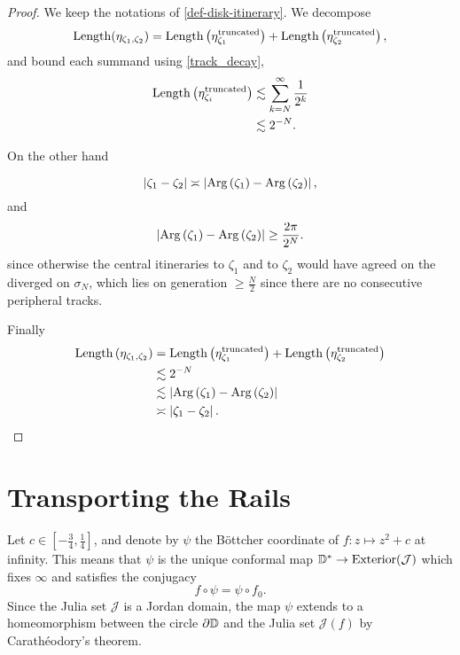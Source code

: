 \begin{proof}
We keep the notations of \cref{def-disk-itinerary}.
We decompose
\begin{equation}
\operatorname{Length}(\eta_{\zeta_{1},\zeta_{2}})=\operatorname{Length}\left(\eta_{\zeta_{1}}^{\text{truncated}}\right)+\operatorname{Length}\left(\eta_{\zeta_{2}}^{\text{truncated}}\right),
\end{equation}
and bound each summand using \cref{track_decay},
\begin{align}
\operatorname{Length}\left(\eta_{\zeta_{i}}^{\text{truncated}}\right)
&\lesssim\sum_{k=N}^{\infty}\frac{1}{2^{k}} \\ 
&\lesssim2^{-N}.
\end{align}

On the other hand 

\begin{equation}
\left|\zeta_{1}-\zeta_{2}\right|
\asymp
	\left|\operatorname{Arg}\left(\zeta_{1}\right)-\operatorname{Arg}\left(\zeta_{2}\right)\right|,
\end{equation}
and
\begin{equation}
\left|\operatorname{Arg}\left(\zeta_{1}\right)-\operatorname{Arg}\left(\zeta_{2}\right)\right|\geq\frac{2\pi}{2^{N}}.
\end{equation}
since otherwise the central itineraries to $\zeta_1$ and to $\zeta_2$ would have agreed on the 
diverged on $\sigma_N$, which lies on generation $\geq \frac N2$ since there are no consecutive peripheral tracks.

Finally
\begin{align*}
	\operatorname{Length}\left(\eta_{\zeta_{1},\zeta_{2}}\right) & = \operatorname{Length}\left(\eta_{\zeta_{1}}^{\text{truncated}}\right)+\operatorname{Length}\left(\eta_{\zeta_{2}}^{\text{truncated}}\right) \\
	& \lesssim 2^{-N} \\
	&\lesssim
	\left|\operatorname{Arg}\left(\zeta_{1}\right)-\operatorname{Arg}\left(\zeta_{2}\right)\right| \\
	&\asymp
	\left|\zeta_{1}-\zeta_{2}\right|.
\end{align*}

\end{proof}









\section{Transporting the Rails} \label{rails-section}
Let $c\in\left[-\frac 34,\frac{1}{4}\right]$, and denote by $\psi$ the Böttcher coordinate of $f: z\mapsto z^2+c$ at infinity. 
This means that $\psi$ is the unique conformal map $\mathbb{D}^{*}\to\mathrm{Exterior}(\mathcal{J})$  which fixes $\infty$ and satisfies the conjugacy $$f\circ\psi=\psi\circ f_{0}.$$
Since the Julia set $\mathcal J$ is a Jordan domain, the map $\psi$ extends to a homeomorphism between the circle
$\partial\mathbb{D}$ and the Julia set $\mathcal{J}(f)$ by Carathéodory's
theorem.

